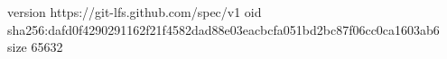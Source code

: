 version https://git-lfs.github.com/spec/v1
oid sha256:dafd0f4290291162f21f4582dad88e03eacbcfa051bd2bc87f06cc0ca1603ab6
size 65632

